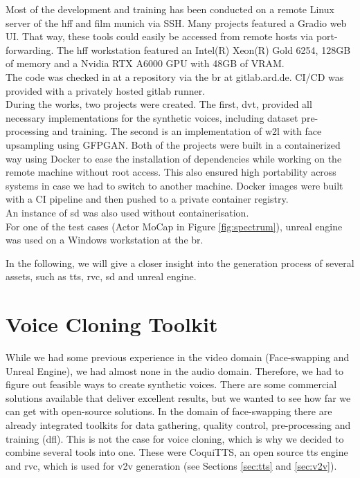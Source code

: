 \documentclass[
  a4paper,  %
  twoside,  %
  bibliography=totoc,
  headsepline,
  cleardoublepage=empty,
  parskip=half,
  draft=false
]{scrbook}
\begin{document}
Most of the development and training has been conducted on a remote Linux server of the \gls{hff} and film munich via SSH. Many projects featured a Gradio web UI. That way, these tools could easily be accessed from remote hosts via port-forwarding. The \gls{hff} workstation featured an Intel(R) Xeon(R) Gold 6254, 128GB of memory and a Nvidia RTX A6000 GPU with 48GB of VRAM. \\
The code was checked in at a repository via the \gls{br} at gitlab.ard.de. CI/CD was provided with a privately hosted gitlab runner. \\
During the works, two projects were created. The first, \gls{dvt}, provided all necessary implementations for the synthetic voices, including dataset pre-processing and training. The second is an implementation of \gls{w2l} with face upsampling using GFPGAN. Both of the projects were built in a containerized way using Docker to ease the installation of dependencies while working on the remote machine without root access. This also ensured high portability across systems in case we had to switch to another machine. Docker images were built with a CI pipeline and then pushed to a private container registry. \\
An instance of \gls{sd} was also used without containerisation.  \\
For one of the test cases (Actor MoCap in Figure \ref{fig:spectrum}), unreal engine was used on a Windows workstation at the \gls{br}.

In the following, we will give a closer insight into the generation process of several assets, such as \gls{tts}, \gls{rvc}, \gls{sd} and unreal engine.

\section{Voice Cloning Toolkit}
\label{sec:dvt}
While we had some previous experience in the video domain (Face-swapping and Unreal Engine), we had almost none in the audio domain. Therefore, we had to figure out feasible ways to create synthetic voices. There are some commercial solutions available that deliver excellent results, but we wanted to see how far we can get with open-source solutions. In the domain of face-swapping there are already integrated toolkits for data gathering, quality control, pre-processing and training (\gls{dfl}). This is not the case for voice cloning, which is why we decided to combine several tools into one. These were CoquiTTS, an open source \gls{tts} engine and \gls{rvc}, which is used for \gls{v2v} generation (see Sections \ref{sec:tts} and \ref{sec:v2v}). 
\end{document}
